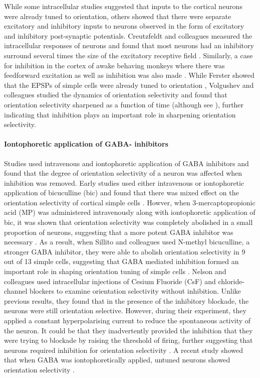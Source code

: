 While some intracellular studies suggested that inputs to the cortical neurons were already tuned to orientation, others showed that there were separate excitatory and inhibitory inputs to neurons observed in the form of excitatory and inhibitory post-synaptic potentials. Creutzfeldt and colleagues measured the intracellular responses of neurons and found that most neurons had an inhibitory surround several times the size of the excitatory receptive field \cite{Creutzfeldt1974}. Similarly, a case for inhibition in the cortex of awake behaving monkeys where there was feedforward excitation as well as inhibition was also made \cite{Celebrini1993}. While Ferster showed that the EPSPs of simple cells were already tuned to orientation \cite{Ferster1986}, Volgushev and colleagues studied the dynamics of orientation selectivity and found that orientation selectivity sharpened as a function of time \cite{Volgushev1995} (although see \cite{Celebrini1993}), further indicating that inhibition plays an important role in sharpening orientation selectivity.


\paragraph{Iontophoretic application of GABA- inhibitors}

Studies used intravenous and iontophoretic application of GABA inhibitors and found that the degree of orientation selectivity of a neuron was affected when inhibition was removed. Early studies used either intravenous or iontophoretic application of bicuculline (bic) and found that there was mixed effect on the orientation selectivity of cortical simple cells \cite{Pettigrew1973, Sillito1975}. Howver, when 3-mercaptopropionic acid (MP) was administered intravenously along with iontophoretic application of bic, it was shown that orientation selectivity was completely abolished in a small proportion of neurons, suggesting that a more potent GABA inhibitor was necessary \cite{Tsumoto1979}. As a result, when Sillito and colleagues used N-methyl bicuculline, a stronger GABA inhibitor, they were able to abolish orientation selectivity in 9 out of 13 simple cells, suggesting that GABA mediated inhibition formed an important role in  shaping orientation tuning of simple cells \cite{Sillito1980}. Nelson and colleagues used intracellular injections of Cesium Fluoride (CsF) and chloride-channel blockers to examine orientation selectivity without inhibition. Unlike previous results, they found that in the presence of the inhibitory blockade, the neurons were still orientation selective. However, during their experiment, they applied a constant hyperpolarising current to reduce the spontaneous activity of the neuron. It could be that they inadvertently provided the inhibition that they were trying to blockade by raising the threshold of firing, further suggesting that neurons required inhibition for orientation selectivity \cite{Nelson1994}. A recent study showed that when GABA was iontophoretically applied, untuned neurons showed orientation selectivity \cite{Li2008}.

